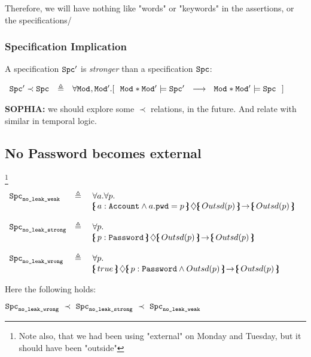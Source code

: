Therefore, we will have nothing like "words" or "keywords" in the assertions, or the specifications/

\subsubsection{Specification Implication}


\begin{definition}
A specification ${\texttt{Spc}}{'}$ is \emph{stronger} than a specification ${\texttt{Spc}}{}$:

$\begin{array}{lll}
 \SpecB{'}\prec \SpecB{} & \triangleq &  
 \forall  \Mod,\Mod'. [\ \  \Mod*\Mod'\models \SpecB{'} \ \ \longrightarrow\ \   \Mod*\Mod' \models \SpecB{}\ \ ]
  \end{array}
$

\end{definition}

\textbf{SOPHIA:} we should explore some $\prec$ relations, in the future. And relate with similar in temporal logic. 

\subsection{No Password becomes external}\footnote{Note also, that we had been using "external" on Monday and Tuesday, but it should have been "outside"}

$\begin{array}{lll}
 \Spec{no\_leak\_weak} & \triangleq &  \forall a.  \forall p.\\
 & &   \onlyIf{a:\prg{Account}\wedge a.\prg{pwd}=p}{\outside{p}} {\outside{p}}\   
~ \\
\\
 \Spec{no\_leak\_strong} & \triangleq &  \forall p.\\
 & &   \onlyIf{p:\prg{Password}} {\outside{p}} {\outside{p}}\  \\
 ~ \\
 \Spec{no\_leak\_wrong} & \triangleq\ & \forall p. \\
 & &    \onlyIf{true} {p:\prg{Password} \wedge \outside{p}} {\outside{p}} 

\end{array}
$

\vspace{.1in}
\noindent
Here the following holds:

$\Spec{no\_leak\_wrong}  \ \prec\ \Spec{no\_leak\_strong}  \ \prec \ \Spec{no\_leak\_weak} $

